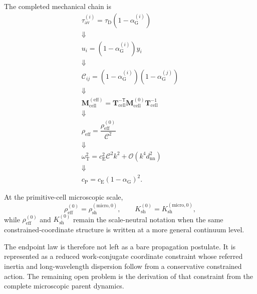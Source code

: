 The completed mechanical chain is
\begin{equation}
\begin{array}{c}
    \tau_{\mathrm{av}}^{(i)} = \tau_{\mathrm{D}} \left( 1-\alpha_{\mathrm{G}}^{(i)} \right) \\
    \Downarrow \\
    u_{i} = \left( 1-\alpha_{\mathrm{G}}^{(i)} \right)y_{i} \\
    \Downarrow \\
    \mathcal{C}_{ij} = \left( 1-\alpha_{\mathrm{G}}^{(i)} \right) \left( 1-\alpha_{\mathrm{G}}^{(j)} \right) \\
    \Downarrow \\
    \mathbf{M}_{\mathrm{cell}}^{(\mathrm{eff})} = \mathbf{T}_{\mathrm{cell}}^{-\mathsf{T}} \mathbf{M}_{\mathrm{cell}}^{(0)} \mathbf{T}_{\mathrm{cell}}^{-1} \\
    \Downarrow \\
    \rho_{\mathrm{eff}} = \dfrac{ \rho_{\mathrm{eff}}^{(0)} }{ \mathcal{C}^2 } \\
    \Downarrow \\
    \omega_{\mathrm{T}}^2 = c_{\mathrm{E}}^2 \mathcal{C}^2k^2 + \mathcal{O} \left( k^4d_{\mathrm{nn}}^2 \right) \\
    \Downarrow \\
    c_{\mathrm{P}} = c_{\mathrm{E}} \left( 1-\alpha_{\mathrm{G}} \right)^2.
\end{array}
\end{equation}

At the primitive-cell microscopic scale,
\begin{equation}
    \rho_{\mathrm{eff}}^{(0)} = \rho_{\mathrm{sh}}^{(\mathrm{micro},0)}, \qquad K_{\mathrm{sh}}^{(0)} = K_{\mathrm{sh}}^{(\mathrm{micro},0)},
\end{equation}
while $\rho_{\mathrm{eff}}^{(0)}$ and $K_{\mathrm{sh}}^{(0)}$ remain the scale-neutral notation when the same constrained-coordinate structure is written at a more general continuum level.

The endpoint law is therefore not left as a bare propagation postulate. It is represented as a reduced work-conjugate coordinate constraint whose referred inertia and long-wavelength dispersion follow from a conservative constrained action. The remaining open problem is the derivation of that constraint from the complete microscopic parent dynamics.

